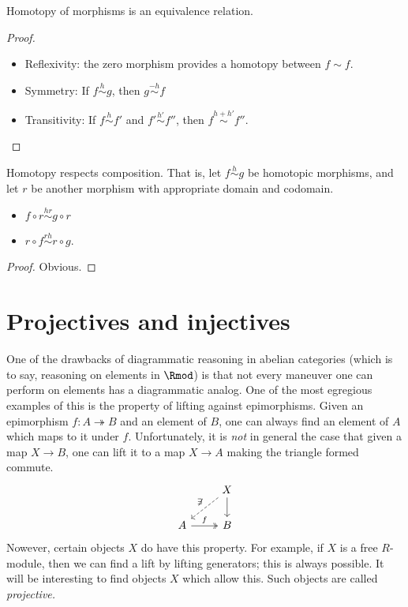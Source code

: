 \documentclass[main.tex]{subfiles}
\begin{document}
\begin{lemma}
  \label{lemma:homotopy_equivalence_relation}
  Homotopy of morphisms is an equivalence relation.
\end{lemma}
\begin{proof}
  \leavevmode
  \begin{itemize}
    \item Reflexivity: the zero morphism provides a homotopy between $f \sim f$.

    \item Symmetry: If $f \overset{h}{\sim} g$, then $g \overset{-h}{\sim} f$

    \item Transitivity: If $f \overset{h}{\sim} f'$ and $f' \overset{h'}{\sim} f''$, then $f \overset{h + h'}{\sim} f''$.
  \end{itemize}
\end{proof}

\begin{lemma}
  \label{lemma:homotopy_respects_composition}
  Homotopy respects composition. That is, let $f \overset{h}{\sim} g$ be homotopic morphisms, and let $r$ be another morphism with appropriate domain and codomain.
  \begin{itemize}
    \item $f \circ r \overset{hr}{\sim} g \circ r$

    \item $r \circ f \overset{rh}{\sim} r \circ g$.
  \end{itemize}
\end{lemma}
\begin{proof}
  Obvious.
\end{proof}

\section{Projectives and injectives}
\label{ssc:projectives_and_injectives}

One of the drawbacks of diagrammatic reasoning in abelian categories (which is to say, reasoning on elements in $\Rmod$) is that not every maneuver one can perform on elements has a diagrammatic analog. One of the most egregious examples of this is the property of lifting against epimorphisms. Given an epimorphism $f\colon A \twoheadrightarrow B$ and an element of $B$, one can always find an element of $A$ which maps to it under $f$. Unfortunately, it is \emph{not} in general the case that given a map $X \to B$, one can lift it to a map $X \to A$ making the triangle formed commute.
\begin{equation*}
  \begin{tikzcd}
    & X
    \arrow[d]
    \arrow[dl, swap, dashed, "\not\exists"]
    \\
    A
    \arrow[r, two heads, "f"]
    & B
  \end{tikzcd}
\end{equation*}
Nowever, certain objects $X$ do have this property. For example, if $X$ is a free $R$-module, then we can find a lift by lifting generators; this is always possible. It will be interesting to find objects $X$ which allow this. Such objects are called \emph{projective.}
\end{document}
